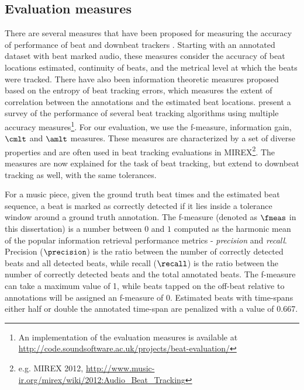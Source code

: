 \subsection{Evaluation measures}\label{sec:bkgnd:evalmeas}
There are several measures that have been proposed for measuring the accuracy of performance of beat and downbeat trackers \cite{davies:09:beatEval}. Starting with an annotated dataset with beat marked audio, these measures consider the accuracy of beat locations estimated, continuity of beats, and the metrical level at which the beats were tracked. There have also been information theoretic measures proposed based on the entropy of beat tracking errors, which measures the extent of correlation between the annotations and the estimated beat locations.  present a survey of the performance of several beat tracking algorithms using multiple accuracy measures\footnote{An implementation of the evaluation measures is available at \url{http://code.soundsoftware.ac.uk/projects/beat-evaluation/}}. For our evaluation, we use the f-measure, information gain, $\cmlt$ and $\amlt$ measures. These measures are characterized by a set of diverse properties and are often used in beat tracking evaluations in \gls{MIREX}\footnote{e.g. MIREX 2012, \url{http://www.music-ir.org/mirex/wiki/2012:Audio\_Beat\_Tracking}}. The measures are now explained for the task of beat tracking, but extend to downbeat tracking as well, with the same tolerances.

For a music piece, given the ground truth beat times and the estimated beat sequence, a beat is marked as correctly detected if it lies inside a tolerance window around a ground truth annotation. The f-measure (denoted as $\fmeas$ in this dissertation) is a number between $0$ and $1$ computed as the harmonic mean of the popular information retrieval performance metrics - \textit{precision} and \textit{recall}. Precision ($\precision$) is the ratio between the number of correctly detected beats and all detected beats, while recall ($\recall$) is the ratio between the number of correctly detected beats and the total annotated beats. The f-measure can take a maximum value of 1, while beats tapped on the off-beat relative to annotations will be assigned an f-measure of 0. Estimated beats with time-spans either half or double the annotated time-span are penalized with a value of 0.667.

